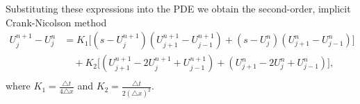 Substituting these expressions into the PDE we obtain the second-order, implicit Crank-Nicolson method
\begin{align*}
U_j^{n+1} - U_j^n &= K_1 \big[(s - U_j^{n+1})(U_{j+1}^{n+1} - U_{j-1}^{n+1}) 
+ (s - U_j^n) (U_{j+1}^n - U_{j-1}^n) \big] \\
&{ }  \quad
+ K_2 \big[(U_{j+1}^{n+1} - 2U_j^{n+1}+ U_{j-1}^{n+1}) + (U_{j+1}^n -2U_j^n + U_{j-1}^n) \big],\\
&{ }  \quad 
\end{align*}
where $K_1 = \frac{ \triangle t }{4 \triangle x}$ and 
$K_2 = \frac{ \triangle t}{2(\triangle x)^2}$.








